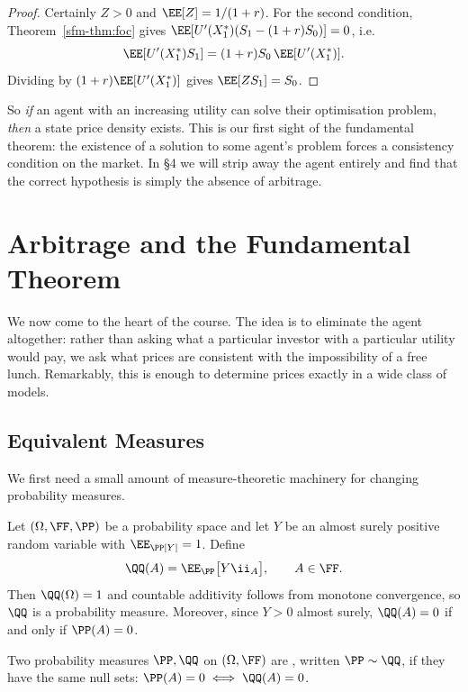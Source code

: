 \begin{proof}
	Certainly $Z > 0$ and $\EE[Z] = 1/(1+r)$. For the second condition, Theorem~\ref{sfm-thm:foc} gives $\EE[U'(X_1^*)(S_1 - (1+r)S_0)] = 0$, i.e.
	$$
	\EE[U'(X_1^*)S_1] = (1+r)S_0\,\EE[U'(X_1^*)].
	$$
	Dividing by $(1+r)\EE[U'(X_1^*)]$ gives $\EE[ZS_1] = S_0$.
\end{proof}

So \emph{if} an agent with an increasing utility can solve their optimisation problem, \emph{then} a state price density exists. This is our first sight of the fundamental theorem: the existence of a solution to some agent's problem forces a consistency condition on the market. In \S4 we will strip away the agent entirely and find that the correct hypothesis is simply the absence of arbitrage.

\section{Arbitrage and the Fundamental Theorem}

We now come to the heart of the course. The idea is to eliminate the agent altogether: rather than asking what a particular investor with a particular utility would pay, we ask what prices are consistent with the impossibility of a free lunch. Remarkably, this is enough to determine prices exactly in a wide class of models.

\subsection{Equivalent Measures}

We first need a small amount of measure-theoretic machinery for changing probability measures.

Let $(\Omega, \FF, \PP)$ be a probability space and let $Y$ be an almost surely positive random variable with $\EE_\PP[Y] = 1$. Define
$$
\QQ(A) = \EE_\PP\big[Y \ii_A\big], \qquad A \in \FF.
$$
Then $\QQ(\Omega) = 1$ and countable additivity follows from monotone convergence, so $\QQ$ is a probability measure. Moreover, since $Y > 0$ almost surely, $\QQ(A) = 0$ if and only if $\PP(A) = 0$.

\begin{definition}
	Two probability measures $\PP, \QQ$ on $(\Omega, \FF)$ are , written $\PP \sim \QQ$, if they have the same null sets: $\PP(A) = 0 \iff \QQ(A) = 0$.
\end{definition}


